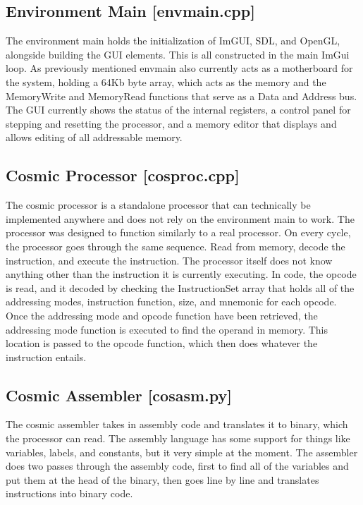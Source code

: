 \documentclass[conference]{IEEEtran}
\begin{document}
\subsection{Environment Main [envmain.cpp]}

The environment main holds the initialization of ImGUI, SDL, and OpenGL, alongside building the GUI elements. This is all constructed in the main ImGui loop. As previously mentioned envmain also currently acts as a motherboard for the system, holding a 64Kb byte array, which acts as the memory and the MemoryWrite and MemoryRead functions that serve as a Data and Address bus. The GUI currently shows the status of the internal registers, a control panel for stepping and resetting the processor, and a memory editor that displays and allows editing of all addressable memory. 


\subsection{Cosmic Processor [cosproc.cpp]}

The cosmic processor is a standalone processor that can technically be implemented anywhere and does not rely on the environment main to work. The processor was designed to function similarly to a real processor. On every cycle, the processor goes through the same sequence. Read from memory, decode the instruction, and execute the instruction. The processor itself does not know anything other than the instruction it is currently executing. In code, the opcode is read, and it decoded by checking the InstructionSet array that holds all of the addressing modes, instruction function, size, and mnemonic for each opcode. Once the addressing mode and opcode function have been retrieved, the addressing mode function is executed to find the operand in memory. This location is passed to the opcode function, which then does whatever the instruction entails.


\subsection{Cosmic Assembler [cosasm.py]}

The cosmic assembler takes in assembly code and translates it to binary, which the processor can read. The assembly language has some support for things like variables, labels, and constants, but it very simple at the moment. The assembler does two passes through the assembly code, first to find all of the variables and put them at the head of the binary, then goes line by line and translates instructions into binary code.
\end{document}
